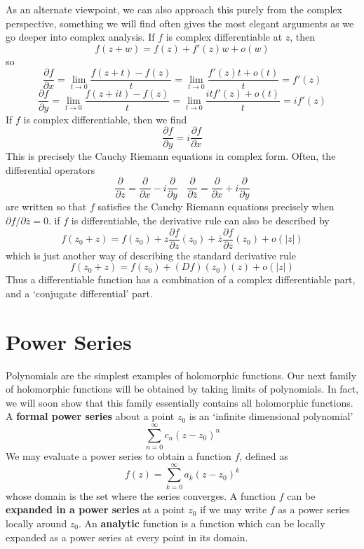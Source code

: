 As an alternate viewpoint, we can also approach this purely from the complex perspective, something we will find often gives the most elegant arguments as we go deeper into complex analysis. If $f$ is complex differentiable at $z$, then
%
\[ f(z + w) = f(z) + f'(z)w + o(w) \]
%
so
%
\[ \frac{\partial f}{\partial x} = \lim_{t \to 0} \frac{f(z + t) - f(z)}{t} = \lim_{t \to 0} \frac{f'(z)t + o(t)}{t} = f'(z) \]
\[ \frac{\partial f}{\partial y} = \lim_{t \to 0} \frac{f(z + it) - f(z)}{t} = \lim_{t \to 0} \frac{itf'(z) + o(t)}{t} = if'(z) \]
%
If $f$ is complex differentiable, then we find
%
\[ \frac{\partial f}{\partial y} = i\frac{\partial f}{\partial x} \]
%
This is precisely the Cauchy Riemann equations in complex form. Often, the differential operators
%
\[ \frac{\partial}{\partial z} = \frac{\partial}{\partial x} - i \frac{\partial}{\partial y}\ \ \ \ \frac{\partial}{\partial \overline{z}} = \frac{\partial}{\partial x} + i \frac{\partial}{\partial y} \]
%
are written so that $f$ satisfies the Cauchy Riemann equations precisely when $\partial f/\partial \overline{z} = 0$. if $f$ is differentiable, the derivative rule can also be described by
%
\[ f(z_0 + z) = f(z_0) + z \frac{\partial f}{\partial z}(z_0) + \overline{z} \frac{\partial f}{\partial \overline{z}}(z_0) + o(|z|) \]
%
which is just another way of describing the standard derivative rule
%
\[ f(z_0 + z) = f(z_0) + (Df)(z_0)(z) + o(|z|) \]
%
Thus a differentiable function has a combination of a complex differentiable part, and a `conjugate differential' part.











\section{Power Series}

Polynomials are the simplest examples of holomorphic functions. Our next family of holomorphic functions will be obtained by taking limits of polynomials. In fact, we will soon show that this family essentially contains all holomorphic functions. A {\bf formal power series} about a point $z_0$ is an `infinite dimensional polynomial'
%
\[ \sum_{n = 0}^\infty c_n (z - z_0)^n \]
%
We may evaluate a power series to obtain a function $f$, defined as
%
\[ f(z) = \sum_{k = 0}^\infty a_k (z - z_0)^k \]
%
whose domain is the set where the series converges. A function $f$ can be {\bf expanded in a power series} at a point $z_0$ if we may write $f$ as a power series locally around $z_0$. An {\bf analytic} function is a function which can be locally expanded as a power series at every point in its domain.

